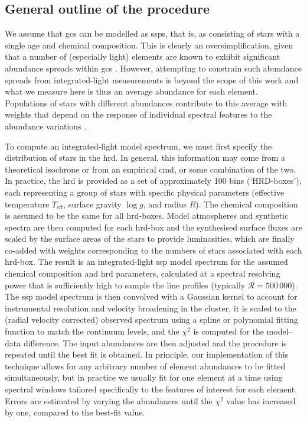 \documentclass{aa}
\begin{document}
\subsection{General outline of the procedure}
\label{sec:outline}

We assume that \acp{gc} can be modelled as \acp{ssp}, that is, as consisting of stars with a single age and chemical composition. This is clearly an oversimplification, given that a number of (especially light) elements are known to exhibit significant abundance spreads within \acp{gc} \citep{Bastian2018,Gratton2019}. However, attempting to constrain such abundance spreads from integrated-light measurements is beyond the scope of this work \citep[but see][]{Larsen2018a} and what we measure here is thus an average abundance for each element. Populations of stars with different abundances contribute to this average with weights that depend on the response of individual spectral features to the abundance variations \citep{Larsen2017}.

To compute an integrated-light model spectrum, we must first specify the distribution of stars in the \ac{hrd}. In general, this information may come from a theoretical isochrone or from an empirical \ac{cmd}, or some combination of the two. 
In practice, the \ac{hrd} is provided as a set of approximately 100 bins (`HRD-boxes'), each representing a group of stars with specific physical parameters (effective temperature $T_\mathrm{eff}$, surface gravity $\log g$, and radius $R$). The chemical composition is assumed to be the same for all \ac{hrd}-boxes. 
Model atmospheres and synthetic spectra are then computed for each \ac{hrd}-box and the synthesised surface fluxes are scaled by the surface areas of the stars to provide luminosities, which are finally co-added with weights corresponding to the numbers of stars associated with each \ac{hrd}-box. The result is an integrated-light \ac{ssp} model spectrum for the assumed chemical composition and \ac{hrd} parameters, calculated at a spectral resolving power that is sufficiently high to sample the line profiles (typically $\mathcal{R} = 500\, 000$). 
The \ac{ssp} model spectrum is then convolved with a Gaussian kernel to account for instrumental resolution and  velocity broadening in the cluster, it is scaled to the (radial velocity corrected) observed spectrum using a spline or polynomial fitting function to match the continuum levels, and the $\chi^2$ is computed for the model--data difference. The input abundances are then adjusted and the procedure is repeated until the best fit is obtained. In principle, our implementation of this technique allows for any arbitrary number of element abundances to be fitted simultaneously, but in practice we usually fit for one element at a time using spectral windows tailored specifically to the features of interest for each element. Errors are estimated by varying the abundances until the $\chi^2$ value has increased by one, compared to the best-fit value. 
\end{document}

